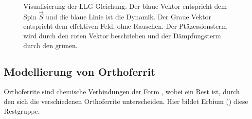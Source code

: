 \documentclass[main.tex]{subfiles}
\begin{document}
\begin{figure}[H]
	\centering
	\caption{Visualisierung der LLG-Gleichung. Der blaue Vektor entspricht dem Spin \(\vec{S}\) und die blaue Linie ist die Dynamik. Der Graue Vektor entspricht dem effektiven Feld, ohne Rauschen. Der Ptäzessionsterm wird durch den roten Vektor beschrieben und der Dämpfungsterm durch den grünen.~\cite{schlegel-master}}
	\label{fig:llg-rauschen}
\end{figure}

\subsection{Modellierung von Orthoferrit}

Orthoferrite sind chemische Verbindungen der Form , wobei  ein Rest ist, durch den sich die verschiedenen Orthoferrite unterscheiden. Hier bildet Erbium () diese Restgruppe. 

\end{document}
